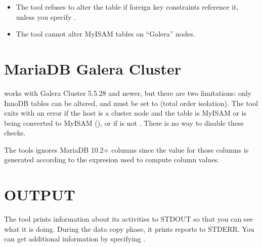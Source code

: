 \documentclass[letterpaper,10pt,english]{sphinxmanual}
\begin{document}
\begin{itemize}
\item {} 
The tool refuses to alter the table if foreign key constraints reference it,
unless you specify {\hyperref[\detokenize{mariadb-schema-change:cmdoption-mariadb-schema-change-alter-foreign-keys-method}]{}}.

\item {} 
The tool cannot alter MyISAM tables on “Galera” nodes.

\end{itemize}


\section{MariaDB Galera Cluster}
\label{\detokenize{mariadb-schema-change:mariadb-galera-cluster}}
 works with Galera Cluster 5.5.28
and newer, but there are two limitations: only InnoDB tables can be altered,
and  must be set to  (total order isolation).
The tool exits with an error if the host is a cluster node and the table
is MyISAM or is being converted to MyISAM (), or if
 is not .  There is no way to disable these checks.

The tools ignores MariaDB 10.2+  columns since the value for those columns
is generated according to the expresion used to compute column values.


\section{OUTPUT}
\label{\detokenize{mariadb-schema-change:output}}
The tool prints information about its activities to STDOUT so that you can see
what it is doing.  During the data copy phase, it prints {\hyperref[\detokenize{mariadb-schema-change:cmdoption-mariadb-schema-change-progress}]{}}
reports to STDERR.  You can get additional information by specifying
{\hyperref[\detokenize{mariadb-schema-change:cmdoption-mariadb-schema-change-print}]{}}.
\end{document}
